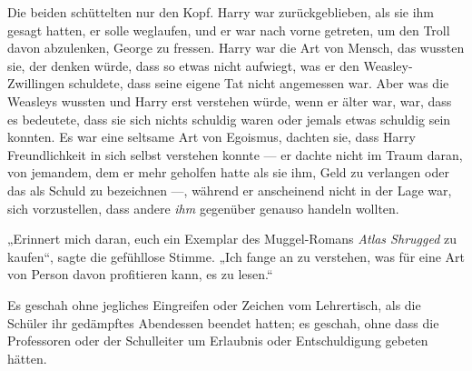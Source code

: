 Die beiden schüttelten nur den Kopf. Harry war zurückgeblieben, als sie ihm gesagt hatten, er solle weglaufen, und er war nach vorne getreten, um den Troll davon abzulenken, George zu fressen. Harry war die Art von Mensch, das wussten sie, der denken würde, dass so etwas nicht aufwiegt, was er den Weasley-Zwillingen schuldete, dass seine eigene Tat nicht angemessen war. Aber was die Weasleys wussten und Harry erst verstehen würde, wenn er älter war, war, dass es bedeutete, dass sie sich nichts schuldig waren oder jemals etwas schuldig sein konnten. Es war eine seltsame Art von Egoismus, dachten sie, dass Harry Freundlichkeit in sich selbst verstehen konnte — er dachte nicht im Traum daran, von jemandem, dem er mehr geholfen hatte als sie ihm, Geld zu verlangen oder das als Schuld zu bezeichnen —, während er anscheinend nicht in der Lage war, sich vorzustellen, dass andere \emph{ihm} gegenüber genauso handeln wollten.

„Erinnert mich daran, euch ein Exemplar des Muggel-Romans \emph{Atlas Shrugged} zu kaufen“, sagte die gefühllose Stimme.
„Ich fange an zu verstehen, was für eine Art von Person davon profitieren kann, es zu lesen.“


Es geschah ohne jegliches Eingreifen oder Zeichen vom Lehrertisch, als die Schüler ihr gedämpftes Abendessen beendet hatten; es geschah, ohne dass die Professoren oder der Schulleiter um Erlaubnis oder Entschuldigung gebeten hätten.

